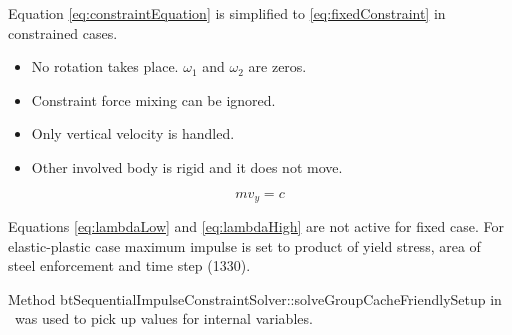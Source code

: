 Equation \ref{eq:constraintEquation} is simplified
to \ref{eq:fixedConstraint} in constrained cases.
\begin{itemize}
\item No rotation takes place. $\omega_1$ and $\omega_2$ are zeros.
\item Constraint force mixing can be ignored.
\item Only vertical velocity is handled.
\item Other involved body is rigid and it does not move.
\end{itemize} 

\begin{equation} \label{eq:fixedConstraint}
m v_y = c 
\end{equation}

Equations \ref{eq:lambdaLow} and \ref{eq:lambdaHigh} are not active for fixed case.
For elastic-plastic case maximum impulse is set to product of yield stress, area of steel enforcement and time step (1330).

Method btSequentialImpulseConstraintSolver::solveGroupCacheFriendlySetup
in \bullet\ was used to pick up values for internal variables. 

